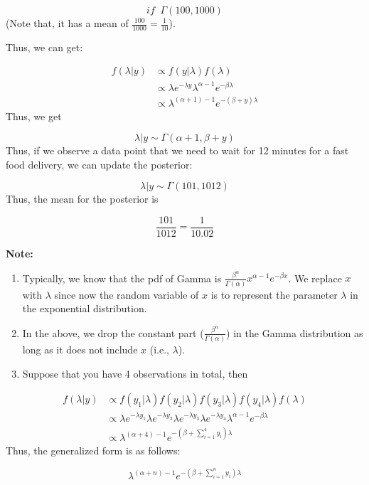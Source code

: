 \documentclass[]{book}
\begin{document}
\[if \; \; \Gamma (100, 1000)\] (Note that, it has a mean of
\(\frac{100}{1000}=\frac{1}{10}\)).

Thus, we can get:

\[\begin{aligned} f(\lambda | y) &\propto f(y|\lambda) f(\lambda) \\ &\propto \lambda e^{-\lambda y} \lambda^{\alpha-1}e^{-\beta \lambda} \\ &\propto \lambda^{(\alpha+1)-1} e^{-(\beta+y)\lambda } \end{aligned}\]
Thus, we get

\[\lambda |y \sim \Gamma (\alpha+1,\beta+y)\] Thus, if we observe a data
point that we need to wait for 12 minutes for a fast food delivery, we
can update the posterior:

\[\lambda |y \sim \Gamma (101,1012)\] Thus, the mean for the posterior
is

\[\frac{101}{1012}=\frac{1}{10.02}\]

\textbf{Note:}

\begin{enumerate}
\def\labelenumi{(\arabic{enumi})}
\item
  Typically, we know that the pdf of Gamma is
  \(\frac{\beta^{\alpha}}{\Gamma(\alpha)}x^{\alpha-1}e^{-\beta x}\). We
  replace \(x\) with \(\lambda\) since now the random variable of \(x\)
  is to represent the parameter \(\lambda\) in the exponential
  distribution.
\item
  In the above, we drop the constant part
  (\(\frac{\beta^{\alpha}}{\Gamma(\alpha)}\)) in the Gamma distribution
  as long as it does not include \(x\) (i.e., \(\lambda\)).
\item
  Suppose that you have 4 observations in total, then
\end{enumerate}

\[\begin{aligned} f(\lambda | y) &\propto f(y_1|\lambda)f(y_2|\lambda)f(y_3|\lambda)f(y_4|\lambda)    f(\lambda) \\ &\propto \lambda e^{-\lambda y_1} \lambda e^{-\lambda y_2}\lambda e^{-\lambda y_3} \lambda e^{-\lambda y_4}   \lambda^{\alpha-1}e^{-\beta \lambda} \\ &\propto \lambda^{(\alpha+4)-1} e^{-(\beta+\sum_{i=1}^4 y_i)\lambda } \end{aligned}\]
Thus, the generalized form is as follows:

\[\lambda^{(\alpha+n)-1} e^{-(\beta+\sum_{i=1}^n y_i)\lambda }\]
\end{document}
